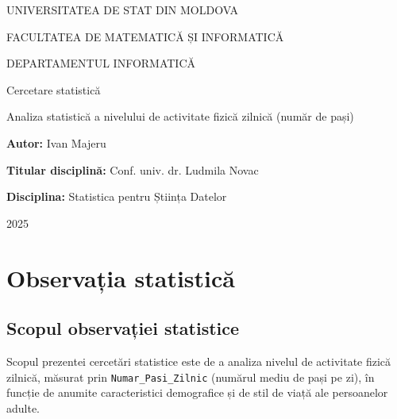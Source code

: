 \documentclass[12pt,a4paper]{report}
\newcommand{\Universitate}{UNIVERSITATEA DE STAT DIN MOLDOVA}
\newcommand{\Facultate}{FACULTATEA DE MATEMATICĂ ȘI INFORMATICĂ}
\newcommand{\Departament}{DEPARTAMENTUL INFORMATICĂ}
\newcommand{\TitluProiect}{Analiza statistică a nivelului de activitate fizică zilnică (număr de pași)}
\newcommand{\Disciplina}{Statistica pentru Știința Datelor}
\newcommand{\Autor}{Ivan Majeru}
\newcommand{\Titular}{Conf. univ. dr. Ludmila Novac}
\newcommand{\An}{2025}
\begin{document}
\begin{titlepage}
  \centering
  {\Large \Universitate\par}
  {\large \Facultate\par}
  {\large \Departament\par}
  \vspace{2cm}
  {\LARGE Cercetare statistică\par}
  \vspace{0.5cm}
  {\Large \TitluProiect\par}
  \vspace{2.5cm}
  \begin{flushleft}
    \textbf{Autor:} \Autor\par
    \textbf{Titular disciplină:} \Titular\par
    \textbf{Disciplina:} \Disciplina\par
  \end{flushleft}
  \vfill
  {\An\par}
\end{titlepage}

\tableofcontents
\clearpage
{}



\section{Observația statistică}

\subsection{Scopul observației statistice}

Scopul prezentei cercetări statistice este de a analiza nivelul de activitate fizică zilnică, măsurat prin \texttt{Numar\_Pasi\_Zilnic} (numărul mediu de pași pe zi), în funcție de anumite caracteristici demografice și de stil de viață ale persoanelor adulte.
\end{document}
